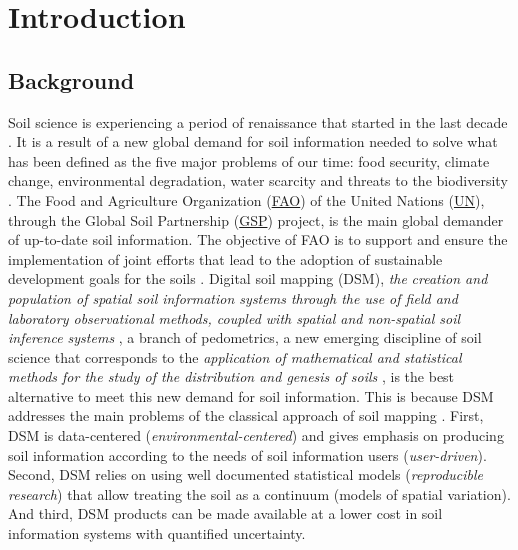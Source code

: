 \setcounter{page}{1}
\artigofalse
\chapter{Introduction}
\label{chap:introduction}

\section{Background}

Soil science is experiencing a period of renaissance that started in the last 
decade \cite{HarteminkEtAl2008}. It is a result of a new global demand for soil 
information needed to solve what has been defined as the five major problems of
our time: food security, climate change, environmental degradation, water 
scarcity and threats to the biodiversity \cite{SanchezEtAl2009}. The Food and 
Agriculture Organization (\href{http://www.fao.org/index_en.htm}{FAO}) of the 
United Nations (\href{http://www.un.org/en/}{UN}), through the Global Soil 
Partnership (\href{http://www.fao.org/globalsoilpartnership/en/}{GSP}) project, 
is the main global demander of up-to-date soil information. The objective of 
FAO is to support and ensure the implementation of joint efforts that lead to 
the adoption of sustainable development goals for the soils \cite{FAO2012}. 
Digital soil mapping (DSM), \textit{the} \textit{creation and population of 
spatial soil information systems through the use of field and laboratory 
observational methods, coupled with spatial and non-spatial soil inference 
systems} \cite{LagacherieEtAl2007a}, a branch of pedometrics, a new emerging 
discipline of soil science that corresponds to the \textit{application of 
mathematical and statistical methods for the study of the distribution and 
genesis of soils} \cite{Heuvelink2003}, is the best alternative to meet this 
new demand for soil information. This is because DSM addresses the main 
problems of the classical approach of soil mapping \cite{Kempen2011}. First, 
DSM is data-centered (\textit{environmental-centered}) and gives emphasis on 
producing soil information according to the needs of soil information users 
(\textit{user-driven}). Second, DSM relies on using well documented statistical
models (\textit{reproducible research}) that allow treating the soil as a 
continuum (models of spatial variation). And third, DSM products can be made 
available at a lower cost in soil information systems with quantified 
uncertainty.

